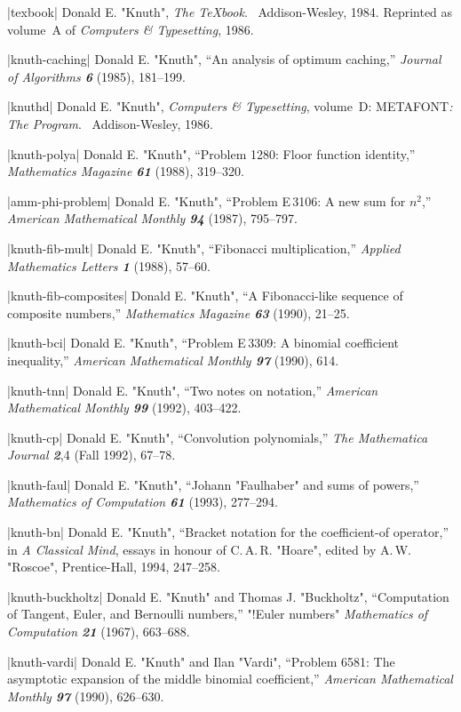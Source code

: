 \bib|texbook|%
Donald E. "Knuth", {\sl The \TeX book}. \ Addison-Wesley, 1984.
Reprinted as volume~A of {\sl Computers \& Typesetting}, 1986.

\bib|knuth-caching|%
Donald E. "Knuth", ``An analysis of optimum caching,''
{\sl Journal of Algorithms\/ \bf6} (1985), 181--199.

\bib|knuthd|%
Donald E. "Knuth", {\sl Computers \& Typesetting}, volume~D:
{\logos METAFONT\kern1pt\sl: The Program}. \
Addison-Wesley, 1986.

\bib|knuth-polya|%
Donald E. "Knuth", ``Problem 1280: Floor function identity,''
{\sl Mathematics Magazine\/ \bf61} (1988), 319--320.

\bib|amm-phi-problem|%
Donald E. "Knuth", ``Problem E\,3106:
A new sum for $n^2$,''
 {\sl American Mathematical Monthly\/ \bf94} (1987), 795--797.

\bib|knuth-fib-mult|%
Donald E. "Knuth", ``Fibonacci multiplication,''
{\sl Applied Mathematics Letters\/ \bf1} (1988), 57--60.

\bib|knuth-fib-composites|%
Donald E. "Knuth", ``A Fibonacci-like sequence of composite numbers,''
 {\sl Mathematics  Magazine\/ \bf63} (1990), 21--25.

\bib|knuth-bci|%
Donald E. "Knuth", ``Problem E\,3309: A binomial coefficient
inequality,''
{\sl American Mathematical Monthly\/ \bf97} (1990), 614.

\bib|knuth-tnn|%
Donald E. "Knuth", ``Two notes on notation,'' {\sl American
Mathematical Monthly\/ \bf99} (1992), 403--422.

\bib|knuth-cp|%
Donald E. "Knuth", ``Convolution polynomials,'' {\sl The Mathematica
Journal\/ \bf2},4 (Fall 1992), 67--78.

\bib|knuth-faul|%
Donald E. "Knuth", ``Johann "Faulhaber" and sums of powers,'' {\sl
Mathematics of Computation\/ \bf 61} (1993), 277--294.

\bib|knuth-bn|%
Donald E. "Knuth", ``Bracket notation for the coefficient-of operator,''
in {\sl A Classical Mind}, essays in honour of C.\,A.\,R.
"Hoare", edited by A.\,W. "Roscoe", Prentice-Hall, 1994, 247--258.

\bib|knuth-buckholtz|%
Donald E. "Knuth" and Thomas J. "Buckholtz", ``Computation of Tangent,
Euler, and Bernoulli numbers,'' "!Euler numbers"
{\sl Mathematics of Computation\/ \bf21} (1967), 663--688.

\bib|knuth-vardi|%
Donald E. "Knuth" and Ilan "Vardi", ``Problem 6581: The asymptotic
expansion of the middle binomial coefficient,'' {\sl American Mathematical
Monthly\/ \bf97} (1990), 626--630.

